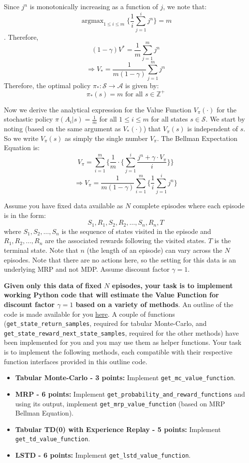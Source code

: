 \documentclass[12pt]{exam}
\DeclareMathOperator*{\argmax}{argmax}
\begin{document}
\begin{questions}
Since $j^n$ is monotonically increasing as a function of $j$, we note that:
$$\argmax_{1\leq i \leq m}  \{\frac1 i  \sum_{j=1}^i j^n \} = m$$.
Therefore,
$$(1-\gamma)V^* = \frac 1 m \sum_{j=1}^m j^n$$
$$\Rightarrow V_* = \frac 1 {m(1-\gamma)} \sum_{j=1}^m j^n$$
Therefore, the optimal policy $\pi_*: \mathcal{S} \rightarrow \mathcal{A}$ is given by:
$$\pi_*(s) = m \mbox{ for all } s \in \mathbb{Z}^+$$

Now we derive the analytical expression for the Value Function $V_{\pi}(\cdot)$ for the stochastic policy $\pi(A_i|s) = \frac 1 m$ for all $1 \leq i \leq m$ for all states $s \in \mathcal{S}$. We start by noting (based on the same argument as $V_*(\cdot)$) that $V_{\pi}(s)$ is independent of $s$. So we write $V_{\pi}(s)$ as simply the single number $V_{\pi}$. The Bellman Expectation Equation is:
$$V_{\pi} =  \sum_{i=1}^m \{ \frac 1 m \cdot \{ \sum_{j=1}^i \frac {j^n + \gamma \cdot V_{\pi}} {i}  \} \}$$
$$\Rightarrow V_{\pi} = \frac 1 {m(1-\gamma)} \sum_{i=1}^m \{ \frac 1 i \sum_{j=1}^i j^n \}$$

\vspace{5mm}

\question Assume you have fixed data available as $N$ complete episodes where each episode is in the form:
$$S_1,R_1,S_2,R_2,\ldots, S_n,R_n, T$$
where $S_1,S_2,\ldots,S_n$ is the sequence of states visited in the episode and $R_1,R_2,\ldots,R_n$ are the associated rewards following the visited states. $T$ is the terminal state. Note that $n$ (the length of an episode) can vary across the $N$ episodes. Note that there are no actions here, so the setting for this data is an underlying MRP and not MDP. Assume discount factor $\gamma = 1$.

{\bf Given only this data of fixed $N$ episodes, your task is to implement working Python code that will estimate the Value Function for discount factor $\gamma = 1$ based on a variety of methods}. An outline of the code is made available for you \href{https://github.com/coverdrive/MDP-DP-RL/blob/master/src/examples/exam_problems/mrp_tdmc_outline.py}{here}. A couple of functions (\lstinline{get_state_return_samples}, required for tabular Monte-Carlo, and \lstinline{get_state_reward_next_state_samples}, required for the other methods) have been implemented for you and you may use them as helper functions. Your task is to implement the following methods, each compatible with their respective function interfaces provided in this outline code. 

\begin{itemize}
\item {\bf Tabular Monte-Carlo - 3 points: } Implement \lstinline{get_mc_value_function}.
\item {\bf MRP - 6 points: } Implement \lstinline{get_probability_and_reward_functions} and using its output, implement \lstinline{get_mrp_value_function} (based on MRP Bellman Equation).
\item {\bf Tabular TD(0) with Experience Replay - 5 points: } Implement \lstinline{get_td_value_function}.
\item {\bf LSTD - 6 points: } Implement \lstinline{get_lstd_value_function}.
\end{itemize}


\end{questions}
\end{document}
